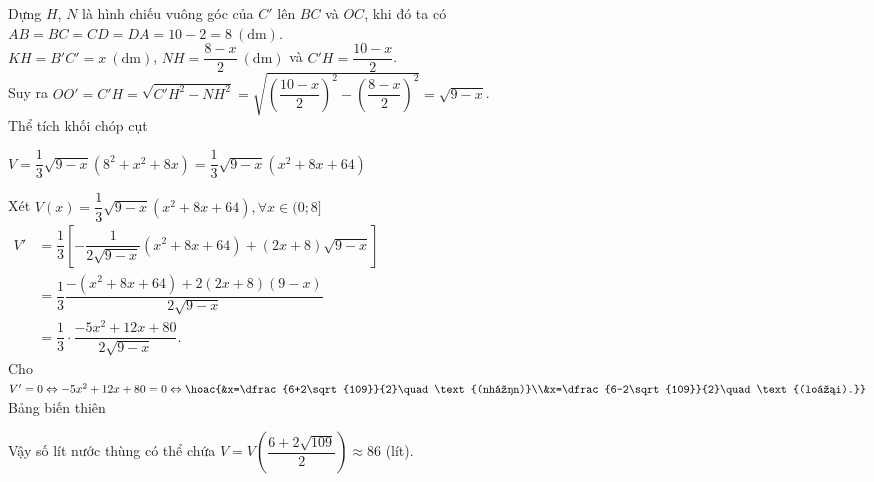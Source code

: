 \begin{ex}
{\begin{center}
\end{center}
Dựng $H$, $N$ là hình chiếu vuông góc của $C'$ lên $BC$ và $OC$, khi đó ta có\\
 $AB=BC=CD=DA=10-2=8\ \mathrm{(dm)}$.\\ 
$KH=B'C'=x\ (\mathrm{dm})$, $NH=\dfrac{8-x}{2}\ \mathrm{(dm)}$ và $C'H=\dfrac{10-x}{2}$.\\
Suy ra $OO'=C'H=\sqrt{C'H^2-NH^2}=\sqrt{\left(\dfrac{10-x}{2}\right)^2-\left(\dfrac{8-x}{2}\right)^2}=\sqrt{9-x}$.\\
Thể tích khối chóp cụt
\begin{center}
	$V=\dfrac{1}{3}\sqrt{9-x}\left(8^2+x^2+8x\right)=\dfrac{1}{3}\sqrt{9-x}\left(x^2+8x+64\right)$
\end{center}
	Xét $V(x)=\dfrac{1}{3}\sqrt{9-x}\left(x^2+8x+64\right), \forall x\in (0;8]$\\
$\begin{aligned}
	V'&=\dfrac{1}{3}\left[-\dfrac{1}{2\sqrt{9-x}}\left(x^2+8x+64\right)+(2x+8)\sqrt{9-x}\right]\\
	&=\dfrac{1}{3}\dfrac{-\left(x^2+8x+64\right)+2(2x+8)(9-x)}{2\sqrt{9-x}}\\
	&=\dfrac{1}{3}\cdot\dfrac{-5x^2+12x+80}{2\sqrt{9-x}}.
\end{aligned}$
\\
Cho $V'=0\Leftrightarrow -5x^2+12x+80=0\Leftrightarrow\hoac{&x=\dfrac{6+2\sqrt{109}}{2}\quad\text{(nhận)}\\&x=\dfrac{6-2\sqrt{109}}{2}\quad\text{(loại).}}$\\
Bảng biến thiên
\begin{center}
\end{center}
Vậy số lít nước thùng có thể chứa $V=V\left(\dfrac{6+2\sqrt{109}}{2}\right)\approx 86$ (lít).
} 
\end{ex}

